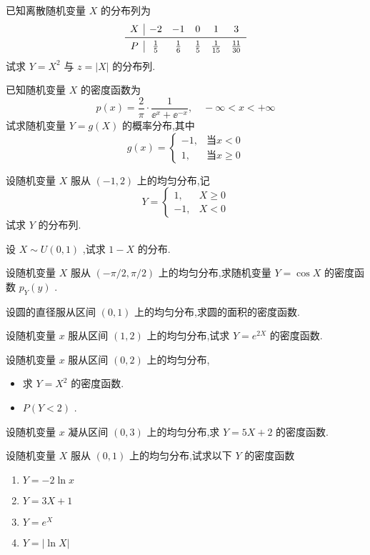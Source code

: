 \begin{xiti}
\item 已知离散随机变量 $ X $ 的分布列为
\[
\begin{array}{c|ccccc}
X & {-2} & {-1} & {0} & {1} & {3} \\ \midrule 
P & {\frac{1}{5}} & {\frac{1}{6}} & {\frac{1}{5}} & {\frac{1}{15}} & {\frac{11}{30}}
\end{array}
\]
试求 $ Y=X^{2} $ 与 $ z=|X| $ 的分布列.
\item 已知随机变量 $ X $ 的密度函数为
\[
p(x)=\frac{2}{\pi} \cdot \frac{1}{\ee ^{x}+\ee ^{-x}}, \quad-\infty<x<+\infty
\]
试求随机变量 $ Y=g(X) $ 的概率分布,其中
\[
g(x)=\left\{
\begin{array}{ll}
{-1,} & {\text{当} x<0}\\ 
{1,} & {\text{当} x \geqslant 0}
\end{array}\right.
\]
\item 设随机变量 $ X $ 服从 $ (-1,2) $ 上的均匀分布,记
\[
Y=\left\{\begin{array}{ll}{1,} & {X \geqslant 0} \\ {-1,} & {X<0}\end{array}\right.
\]
试求 $ Y $ 的分布列.
\item 设 $ X \sim U(0,1) $ ,试求 $ 1-X $ 的分布.
\item 设随机变量 $ X $ 服从 $ (-\pi / 2, \pi / 2) $ 上的均匀分布,求随机变量 $ Y=\cos X $ 的密度函数 $ p_{Y}(y) $ .
\item 设圆的直径服从区间 $ (0,1) $ 上的均匀分布,求圆的面积的密度函数.
\item 设随机变量 $ x $ 服从区间 $ (1,2) $ 上的均匀分布,试求 $ Y=e^{2 X} $ 的密度函数.
\item 设随机变量 $ x $ 服从区间 $ (0,2) $ 上的均匀分布,
\begin{itemize}
	\item 求 $ Y=X^{2} $ 的密度函数.
	\item $ P(Y<2) $ .
\end{itemize}
\item 设随机变量 $ x $ 凝从区间 $ (0,3) $ 上的均匀分布,求 $ Y=5X+2 $ 的密度函数.
\item 设随机变量 $ X $ 服从 $ (0,1) $ 上的均匀分布,试求以下 $ Y $ 的密度函数
\begin{enumerate}
	\item $ Y=-2\ln x $ 
	\item $ Y=3X+1 $ 
	\item $ Y=e^{X} $ 
	\item $ Y=|\ln X| $ 
\end{enumerate}

\end{xiti}

